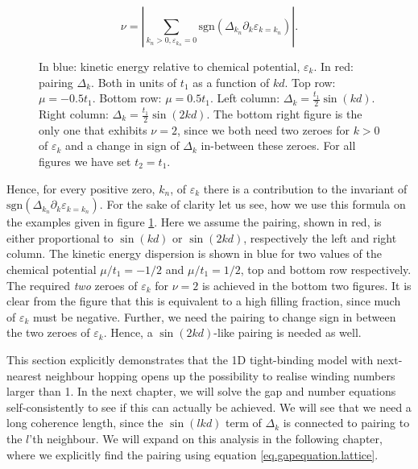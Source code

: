 \begin{equation}
\nu = \left|\sum_{k_n > 0, \varepsilon_{k_n} = 0} \text{sgn}\left(\Delta_{k_n}\partial_k\varepsilon_{k = k_n}\right)\right|.
\label{eq.topologicalinvariant}
\end{equation} 

\begin{figure}
\begin{center}

\caption{In blue: kinetic energy relative to chemical potential, $\varepsilon_k$. In red: pairing $\Delta_k$. Both in units of $t_1$ as a function of $kd$. Top row: $\mu = -0.5 t_1$. Bottom row: $\mu = 0.5 t_1$. Left column: $\Delta_k = \frac{t_1}{2}\sin(kd)$. Right column: $\Delta_k = \frac{t_1}{2}\sin(2kd)$. The bottom right figure is the only one that exhibits $\nu = 2$, since we both need two zeroes for $k >0$ of $\varepsilon_k$ and a change in sign of $\Delta_k$ in-between these zeroes. For all figures we have set $t_2 = t_1$. }
\label{fig.dispersions.lattice}
\end{center}
\end{figure}

Hence, for every positive zero, $k_n$, of $\varepsilon_k$ there is a contribution to the invariant of $\text{sgn}\left(\Delta_{k_n}\partial_k\varepsilon_{k = k_n}\right)$. For the sake of clarity let us see, how we use this formula on the examples given in figure \ref{fig.dispersions.lattice}. Here we assume the pairing, shown in red, is either proportional to $\sin(kd)$ or $\sin(2kd)$, respectively the left and right column. The kinetic energy dispersion is shown in blue for two values of the chemical potential $\mu / t_1 = -1/2$ and $\mu / t_1 = 1/2$, top and bottom row respectively. The required \textit{two} zeroes of $\varepsilon_k$ for $\nu = 2$ is achieved in the bottom two figures. It is clear from the figure that this is equivalent to a high filling fraction, since much of $\varepsilon_k$ must be negative. Further, we need the pairing to change sign in between the two zeroes of $\varepsilon_k$. Hence, a $\sin(2kd)$-like pairing is needed as well. 

This section explicitly demonstrates that the 1D tight-binding model with next-nearest neighbour hopping opens up the possibility to realise winding numbers larger than 1. In the next chapter, we will solve the gap and number equations self-consistently to see if this can actually be achieved. We will see that we need a long coherence length, since the $\sin(lkd)$ term of $\Delta_k$ is connected to pairing to the $l$'th neighbour. We will expand on this analysis in the following chapter, where we explicitly find the pairing using equation \eqref{eq.gapequation.lattice}.

